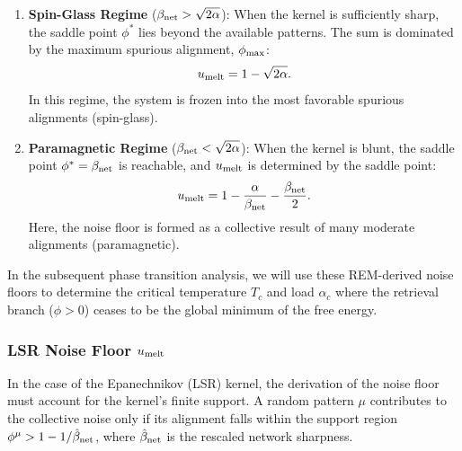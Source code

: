 \documentclass{article}
\theoremstyle{plain}
\theoremstyle{definition}
\theoremstyle{remark}
\begin{document}
\begin{enumerate}
    \item \textbf{Spin-Glass Regime} ($\beta_{\rm net} > \sqrt{2\alpha}$): 
    When the kernel is sufficiently sharp, the saddle point $\phi^*$ lies beyond the available patterns. The sum is dominated by the maximum spurious alignment, $\phi_{\rm max}$:
    \begin{equation}
        u_{\rm melt} = 1 - \sqrt{2\alpha}.
    \end{equation}
    In this regime, the system is frozen into the most favorable spurious alignments (spin-glass).
    
    \item \textbf{Paramagnetic Regime} ($\beta_{\rm net} < \sqrt{2\alpha}$): 
    When the kernel is blunt, the saddle point $\phi^* = \beta_{\rm net}$ is reachable, and $u_{\rm melt}$ is determined by the saddle point:
    \begin{equation}
        u_{\rm melt} = 1 - \frac{\alpha}{\beta_{\rm net}} - \frac{\beta_{\rm net}}{2}.
    \end{equation}
    Here, the noise floor is formed as a collective result of many moderate alignments (paramagnetic).
\end{enumerate}

In the subsequent phase transition analysis, we will use these REM-derived noise floors to determine the critical temperature $T_c$ and load $\alpha_c$ where the retrieval branch ($\phi > 0$) ceases to be the global minimum of the free energy.

\subsubsection{LSR Noise Floor $u_{\rm melt}$}

In the case of the Epanechnikov (LSR) kernel, the derivation of the noise floor must account for the kernel's finite support. A random pattern $\mu$ contributes to the collective noise only if its alignment falls within the support region $\phi^\mu > 1 - 1/\hat\beta_{\rm net}$, where $\hat\beta_{\rm net}$ is the rescaled network sharpness.
\end{document}
